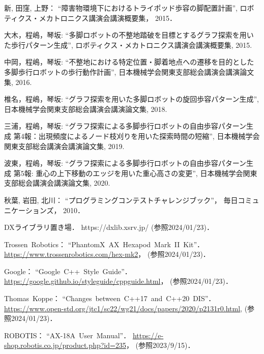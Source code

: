\begin{thebibliography}{99}
    新, 田窪, 上野：
    ``障害物環境下におけるトライポッド歩容の脚配置計画'',
    ロボティクス・メカトロニクス講演会講演概要集，
    2015．

    大木，程嶋，琴坂: 
    ``多脚ロボットの不整地踏破を目標とするグラフ探索を用いた歩行パターン生成'', 
    ロボティクス・メカトロニクス講演会講演概要集,
    2015.   

    中岡，程嶋，琴坂: 
    ``不整地における特定位置・脚着地点への遷移を目的とした多脚歩行ロボットの歩行動作計画'',
    日本機械学会関東支部総会講演会講演論文集,
    2016.

    椎名，程嶋，琴坂: 
    ``グラフ探索を用いた多脚ロボットの旋回歩容パターン生成'',
    日本機械学会関東支部総会講演会講演論文集,
    2018.

    三浦，程嶋，琴坂: 
    ``グラフ探索による多脚歩行ロボットの自由歩容パターン生成 第4報：出現頻度によるノード枝刈りを用いた探索時間の短縮'',
    日本機械学会関東支部総会講演会講演論文集,
    2019.

    波東，程嶋，琴坂: 
    ``グラフ探索による多脚歩行ロボットの自由歩容パターン生成 第5報: 重心の上下移動のエッジを用いた重心高さの変更'',
    日本機械学会関東支部総会講演会講演論文集,
    2020.

    秋葉, 岩田, 北川：
    ``プログラミングコンテストチャレンジブック''，
    毎日コミュニケーションズ，
    2010．
    
    DXライブラリ置き場．
    https://dxlib.xsrv.jp/ (参照2024/01/23)．

    Trossen~Robotics：
    ``PhantomX~AX~Hexapod~Mark~II~Kit''．
    \url{https://www.trossenrobotics.com/hex-mk2}，
    (参照2024/01/23)．

    Google：
    ``Google~C++~Style~Guide''．
    \url{https://google.github.io/styleguide/cppguide.html}，
    (参照2024/01/23)．

    Thomas~Koppe：
    ``Changes~between~C++17~and~C++20~DIS''．
    \url{https://www.open-std.org/jtc1/sc22/wg21/docs/papers/2020/p2131r0.html}, 
    (参照2024/01/23)．

    ROBOTIS：
    ``AX-18A~User~Manual''．
    \url{https://e-shop.robotis.co.jp/product.php?id=235}，
    (参照2023/9/15)．

\end{thebibliography}
\endinput